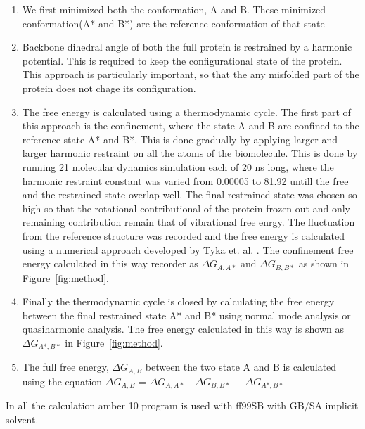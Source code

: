 \documentclass[12pt]{article}
\begin{document}
\begin{enumerate}

\item  We first minimized both the conformation, A and B. These minimized conformation(A* and B*) 
       are the reference conformation of that state

\item Backbone dihedral angle of both the full protein is restrained by a harmonic potential. This is required to keep
    the configurational state of the protein. This approach is particularly important, so that the any misfolded part 
    of the protein does not chage its configuration. 

\item  The free energy is calculated using a thermodynamic cycle. The first part of this approach is the confinement, where
       the state A and B are confined to the reference state A* and B*. This is done gradually by applying larger and larger
       harmonic restraint on all the atoms of the biomolecule. This is done by running 21 molecular dynamics simulation 
       each of 20 ns long, where the harmonic restraint constant was varied from 0.00005 to 81.92 untill the free and the 
       restrained state overlap well. The final restrained state was chosen so high so that the rotational contributional 
       of the protein frozen out and only remaining contribution remain that of vibrational free enrgy. The fluctuation from
       the reference structure was recorded and the free energy is calculated using a numerical
       approach developed by Tyka et. al. \cite{Tyka2006}. The confinement free energy calculated in this way recorder as 
       $\Delta G_{A,A*}$ and $\Delta G_{B,B*}$ as shown in Figure~\ref{fig:method}.     

\item  Finally the thermodynamic cycle is closed by calculating the free energy between the final
       restrained state A* and B* using normal mode analysis or quasiharmonic analysis. The free energy calculated in 
       this way is shown as $\Delta G_{A*,B*}$ in Figure~\ref{fig:method}.

\item  The full free energy, $\Delta G_{A,B}$ between the two state A and B is calculated using the equation 
       $\Delta G_{A,B}$ = $\Delta G_{A,A*}$ - $\Delta G_{B,B*}$ + $\Delta G_{A*,B*}$  

\end{enumerate}

In all the calculation amber 10 program is used with ff99SB with GB/SA implicit solvent.  
\end{document}
